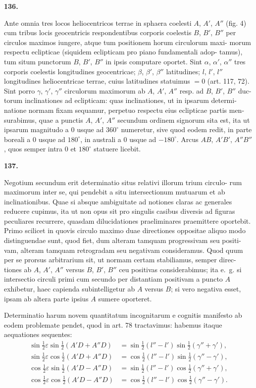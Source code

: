 \documentclass[12pt,a4paper]{article}
\begin{document}
\bigskip
\noindent\textbf{136.}

Ante omnia tres locos heliocentricos terrae in sphaera coelesti $A$, $A'$, $A''$
(fig. 4) cum tribus locis geocentricis respondentibus corporis coelestis $B$, $B'$, $B''$
per circulos maximos iungere, atque tum positionem horum circulorum maxi-
morum respectu eclipticae (siquidem eclipticam pro piano fundamentali adop-
tamus), tum situm punctorum $B$, $B'$, $B''$ in ipsis computare oportet. Sint $\alpha$,
$\alpha'$, $\alpha''$ tres corporis coelestis longitudines geocentricae; $\beta$, $\beta'$, $\beta''$ latitudines; $l$, $l'$,
$l''$ longitudines heliocentricae terrae, cuius latitudines statuimus $= 0$ (art. 117, 72).
Sint porro $\gamma$, $\gamma'$, $\gamma''$ circulorum maximorum ab $A$, $A'$, $A''$ resp. ad $B$, $B'$, $B''$ duc-
torum inclinationes ad eclipticam: quas inclinationes, ut in ipsarum determi-
natione normam fixam sequamur, perpetuo respectu eius eclipticae partis men-
surabimus, quae a punctis $A$, $A'$, $A''$ secundum ordinem signorum sita est, ita
ut ipsarum magnitudo a $0$ usque ad $360^\circ$ numeretur, sive quod eodem redit,
in parte boreali a $0$ usque ad $180^\circ$, in australi a $0$ usque ad $-180^\circ$. Arcus
$AB$, $A'B'$, $A''B''$, quos semper intra $0$ et $180^\circ$ statuere licebit.

\bigskip
\noindent\textbf{137.}

Negotium secundum erit determinatio situs relativi illorum trium circulo-
rum maximorum inter se, qui pendebit a situ intersectionum mutuarum et ab
inclinationibus. Quae si absque ambiguitate ad notiones claras ac generales
reducere cupimus, ita ut non opus sit pro singulis casibus diversis ad figuras
peculiares recurrere, quasdam dilucidationes praeliminares praemittere oportebit.
Primo scilicet in quovis circulo maximo duae directiones oppositae aliquo modo
distinguendae sunt, quod fiet, dum alteram tamquam progressivam seu positi-
vam, alteram tamquam retrogradam seu negativam consideramus. Quod quum
per se prorsus arbitrarium sit, ut normam certam stabiliamus, semper direc-
tiones ab $A$, $A'$, $A''$ versus $B$, $B'$, $B''$ ceu positivas considerabimus; ita e.~g. si
intersectio circuli primi cum secundo per distantiam positivam a puncto $A$
exhibetur, haec capienda subintelligetur ab $A$ versus $B$; si vero negativa esset, ipsam ab altera parte ipsius $A$ sumere oporteret.

Determinatio harum novem quantitatum incognitarum e cognitis manifesto
ab eodem problemate pendet, quod in art. 78 tractavimus: habemus itaque
aequationes sequentes:
\begin{align}
\sin\tfrac{1}{2}\varepsilon \sin\tfrac{1}{2}(A'D + A''D) &= \sin\tfrac{1}{2}(l'' - l')\sin\tfrac{1}{2}(\gamma'' + \gamma'), \\
\sin\tfrac{1}{2}\varepsilon \cos\tfrac{1}{2}(A'D + A''D) &= \cos\tfrac{1}{2}(l'' - l')\sin\tfrac{1}{2}(\gamma'' - \gamma'), \\
\cos\tfrac{1}{2}\varepsilon \sin\tfrac{1}{2}(A'D - A''D) &= \sin\tfrac{1}{2}(l'' - l')\cos\tfrac{1}{2}(\gamma'' + \gamma'), \\
\cos\tfrac{1}{2}\varepsilon \cos\tfrac{1}{2}(A'D - A''D) &= \cos\tfrac{1}{2}(l'' - l')\cos\tfrac{1}{2}(\gamma'' - \gamma').
\end{align}
\end{document}
